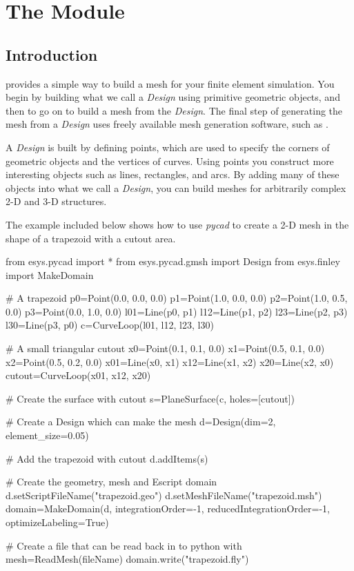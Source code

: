 
%
%
%


\chapter{The Module \pycad} \label{PYCAD CHAP}


\section{Introduction}

\pycad provides a simple way to build a mesh for your finite element
simulation.  You begin by building what we call a {\it Design} using
primitive geometric objects, and then to go on to build a mesh from
the {\it Design}.  The final step of generating the mesh from a {\it
Design} uses freely available mesh generation software, such as \gmshextern.

A {\it Design} is built by defining points, which are used to specify
the corners of geometric objects and the vertices of curves.  Using
points you construct more interesting objects such as lines,
rectangles, and arcs.  By adding many of these objects into what we
call a {\it Design}, you can build meshes for arbitrarily complex 2-D
and 3-D structures.

The example included below shows how to use {\it pycad} to create a 2-D mesh
in the shape of a trapezoid with a cutout area.

\begin{python}
	from esys.pycad import *
	from esys.pycad.gmsh import Design
	from esys.finley import MakeDomain

	# A trapezoid
	p0=Point(0.0, 0.0, 0.0)
	p1=Point(1.0, 0.0, 0.0)
	p2=Point(1.0, 0.5, 0.0)
	p3=Point(0.0, 1.0, 0.0)
	l01=Line(p0, p1)
	l12=Line(p1, p2)
	l23=Line(p2, p3)
	l30=Line(p3, p0)
	c=CurveLoop(l01, l12, l23, l30)

	# A small triangular cutout
	x0=Point(0.1, 0.1, 0.0)
	x1=Point(0.5, 0.1, 0.0)
	x2=Point(0.5, 0.2, 0.0)
	x01=Line(x0, x1)
	x12=Line(x1, x2)
	x20=Line(x2, x0)
	cutout=CurveLoop(x01, x12, x20)

	# Create the surface with cutout
	s=PlaneSurface(c, holes=[cutout])

	# Create a Design which can make the mesh
	d=Design(dim=2, element_size=0.05)

	# Add the trapezoid with cutout
	d.addItems(s)

	# Create the geometry, mesh and Escript domain
	d.setScriptFileName("trapezoid.geo")
	d.setMeshFileName("trapezoid.msh")
	domain=MakeDomain(d, integrationOrder=-1, reducedIntegrationOrder=-1, optimizeLabeling=True)

	# Create a file that can be read back in to python with mesh=ReadMesh(fileName)
	domain.write("trapezoid.fly")
\end{python}


